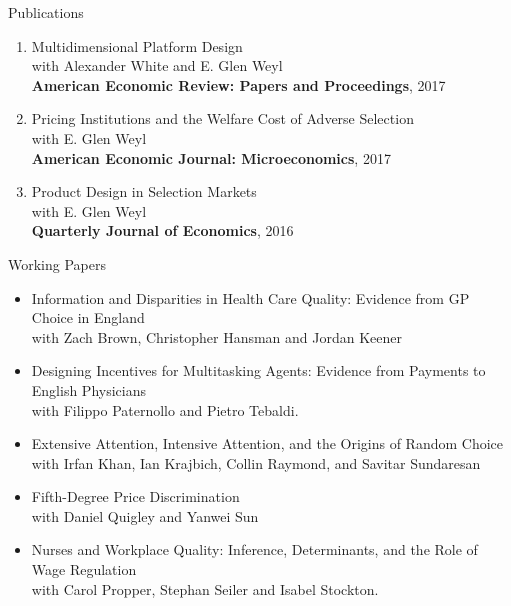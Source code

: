 \documentclass{resume}
\begin{document}
\begin{rSection}{Publications}
\begin{enumerate}
\item Multidimensional Platform Design\\ 
with Alexander White and E. Glen Weyl \\
\textbf{American Economic Review: Papers and Proceedings}, 2017

\item Pricing Institutions and the Welfare Cost of Adverse Selection\\
 with E. Glen Weyl \\
\textbf{American Economic Journal: Microeconomics}, 2017

\item Product Design in Selection Markets\\
 with E. Glen Weyl \\ 
\textbf{Quarterly Journal of Economics}, 2016
	
\end{enumerate}






\end{rSection}










\begin{rSection}{Working Papers}

\begin{itemize}
	\item Information and Disparities in Health Care Quality: Evidence from GP Choice in England \\ 
	with Zach Brown, Christopher Hansman and Jordan Keener 

	\item Designing Incentives for Multitasking Agents: Evidence from Payments to English Physicians\\ 
	with Filippo Paternollo and Pietro Tebaldi. 
	
	\item Extensive Attention, Intensive Attention, and the Origins of Random Choice\\ 
	with Irfan Khan, Ian Krajbich, Collin Raymond, and Savitar Sundaresan
	
	\item Fifth-Degree Price Discrimination \\ 
	with Daniel Quigley and Yanwei Sun
	
	\item Nurses and Workplace Quality: Inference, Determinants, and the Role of Wage Regulation \\ 
	with Carol Propper, Stephan Seiler and Isabel Stockton.


\end{itemize}




\end{rSection}
\end{document}
